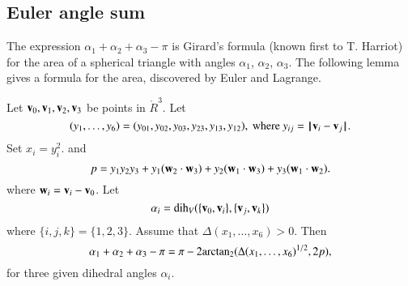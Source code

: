 \subsection{Euler angle sum}

The expression $\alpha_1+\alpha_2+\alpha_3-\pi$ is Girard's
formula (known first to T. Harriot) 
for the area of a spherical triangle with angles
$\alpha_1$, $\alpha_2$, $\alpha_3$.  The following lemma
gives a formula for the area, discovered by
Euler and Lagrange.
%
%
%
%
%

\begin{lemma}\label{lemma:euler}
Let ${\mathbf v}_0,{\mathbf v}_1,{\mathbf v}_2,{\mathbf v}_3$ be points in $\ring{R}^3$. 
Let 
  $$(y_1,\ldots,y_6) =(y_{01},y_{02},y_{03},y_{23},y_{13},y_{12}),
   \text{ where } y_{ij}={\hskip0.1em|\hskip-0.15em|\hskip0.1em}{\mathbf v}_i - {\mathbf v}_j{\hskip0.1em|\hskip-0.15em|\hskip0.1em}.$$
Set
$x_i = y_i^2$.   
and
    $$
    p = y_1 y_2 y_3 + y_1 ({\mathbf w}_2\cdot {\mathbf w}_3) + y_2 ({\mathbf w}_1\cdot {\mathbf w}_3) + y_3
    ({\mathbf w}_1\cdot {\mathbf w}_2).
    $$
%
where ${\mathbf w}_i = {\mathbf v}_i- {\mathbf v}_0$.
Let $$\alpha_i =\operatorname{dih}_V(\{{\mathbf v}_0,{\mathbf v}_i\},\{{\mathbf v}_j,{\mathbf v}_k\})$$
where $\{i,j,k\}=\{1,2,3\}$.
Assume that $\Delta(x_1,\ldots,x_6)>0$. 
Then
    $$
    \alpha_1+\alpha_2+\alpha_3 - \pi
     = {\pi} - 2{\operatorname{arctan_2}}({\Delta(x_1,\ldots,x_6)^{1/2}},{2 p}),
    $$
for three given dihedral angles $\alpha_i$.
\end{lemma}
%

